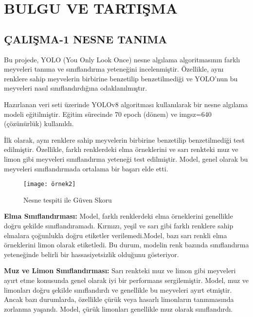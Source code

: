 \documentclass[11pt,a4paper]{report}
\begin{document}
   \section{BULGU VE TARTIŞMA}
   \subsection{ÇALIŞMA-1  NESNE TANIMA}
   \begin{justify}
   	 Bu projede, YOLO (You Only Look Once) nesne algılama algoritmasının farklı meyveleri tanıma ve sınıflandırma yeteneğini incelenmiştir. Özellikle, aynı renklere sahip meyvelerin birbirine benzetilip benzetilmediği ve YOLO'nun bu meyveleri nasıl sınıflandırdığına odaklanılmıştır.
   	\newline
   	
   	Hazırlanan veri seti üzerinde YOLOv8 algoritması kullanılarak bir nesne algılama modeli eğitilmiştir. Eğitim sürecinde 70 epoch (dönem) ve imgsz=640 (çözünürlük) kullanıldı.
   	\newline
   	
   	İlk olarak, aynı renklere sahip meyvelerin birbirine benzetilip benzetilmediği test edilmiştir. Özellikle, farklı renklerdeki elma örneklerini ve sarı renkteki muz ve limon gibi meyveleri sınıflandırma yeteneği test edilmiştir. Model, genel olarak bu meyveleri sınıflandırmada ortalama bir başarı elde etti.
   	\newline
   	
   	\begin{figure}[!h]
   		\centering
   		\texttt{[image: örnek2]}
   		\caption{Nesne tespiti ile Güven Skoru}
   		
   	\end{figure}
   	 \textbf{Elma Sınıflandırması:} Model, farklı renklerdeki elma örneklerini genellikle doğru şekilde sınıflandıramadı. Kırmızı, yeşil ve sarı gibi farklı renklere sahip elmalara çoğunlukla doğru etiketler verilemedi.Model, bazı sarı renkli elma örneklerini limon olarak etiketledi. Bu durum, modelin renk bazında sınıflandırma yeteneğinde belirli bir hassasiyetsizlik olduğunu gösteriyor.
   	\newline
   	
   	\textbf{Muz ve Limon Sınıflandırması:} Sarı renkteki muz ve limon gibi meyveleri ayırt etme konusunda genel olarak iyi bir performans sergilemiştir. Model, muz ve limonları doğru şekilde sınıflandırdı ve genellikle bu meyveleri ayırt etmiştir. Ancak bazı durumlarda, özellikle çürük veya hasarlı limonların tanınmasında zorlanma yaşandı. Model, çürük limonları genellikle muz olarak sınıflandırdı.
   	

\end{justify}
\end{document}
